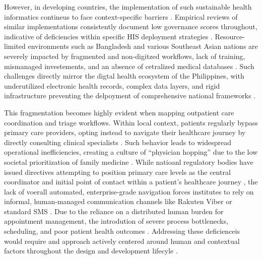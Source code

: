 \documentclass[manuscript, screen, review]{acmart}
\begin{document}
However, in developing countries, the implementation of such sustainable health informatics contineus to face context-specific barriers \cite{rahman_2024_healthcare}. Empirical reviews of similar implementations consistently document low governance scores throughout, indicative of deficiencies within specific HIS deployment strategies \cite{sucaldito_2025_challenges}. Resource-limited environments such as Bangladesh and various Southeast Asian nations are severely impacted by fragmented and non-digitzed workflows, lack of training, mismanaged investements, and an absence of cetralized medical databases \cite{lu_2021_assessment,rahman_2024_healthcare}. Such challenges directly mirror the digtal health ecosystem of the Philippines, with underutilized electronic health records, complex data layers, and rigid infrastructure preventing the delpoyment of comprehensive national frameworks \cite{garcia_2021_health,sucaldito_2025_challenges}.

This fragmentation becomes highly evident when mapping outpatient care coordination and triage workflows. Within local context, patients regularly bypass primary care providers, opting instead to navigate their healthcare journey by directly consulting clinical specialists \cite{Lajeunesse2012}. Such behavior leads to widespread operational inefficiencies, creating a culture of ``physician hopping'' due to the low societal prioritization of family medicine \cite{Lajeunesse2012}. While natioanl regulatory bodies have issued directives attempting to position primary care levels as the central coordinator and initial point of contact within a patient's healthcare journey \cite{DOH_AO_2020_0024}, the lack of voerall automated, enterprise-grade navigation forces institutes to rely on informal, human-managed communication channels like Rakuten Viber or standard SMS \cite{Rodriguez_A}. Due to the reliance on a distributed human burden for appointment management, the introdution of severe process bottlenecks, scheduling, and poor patient health outcomes \cite{Rodriguez_A,Chang682}. Addressing these deficienceis would require and approach actively centered around human and contextual factors throughout the design and development lifecyle \cite{garcia_2021_health,leary_2022_an}.
\end{document}
